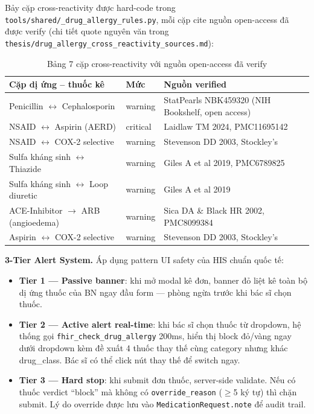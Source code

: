 \documentclass[a4paper,13pt,3p,oneside]{report}
\theoremstyle{definition}
\theoremstyle{remark}
\theoremstyle{definition}
\begin{document}
Bảy cặp cross-reactivity được hard-code trong \texttt{tools/shared/\_drug\_allergy\_rules.py}, mỗi cặp cite nguồn open-access đã được verify (chi tiết quote nguyên văn trong \texttt{thesis/drug\_allergy\_cross\_reactivity\_sources.md}):

\begin{table}[H]
\centering
\begin{tabular}{|p{4.5cm}|p{2cm}|p{6.5cm}|}
\hline
\textbf{Cặp dị ứng -- thuốc kê} & \textbf{Mức} & \textbf{Nguồn verified} \\
\hline
Penicillin $\leftrightarrow$ Cephalosporin & warning & StatPearls NBK459320 (NIH Bookshelf, open access) \\
\hline
NSAID $\leftrightarrow$ Aspirin (AERD) & critical & Laidlaw TM 2024, PMC11695142 \\
\hline
NSAID $\leftrightarrow$ COX-2 selective & warning & Stevenson DD 2003, Stockley's~\cite{stockley} \\
\hline
Sulfa kháng sinh $\leftrightarrow$ Thiazide & warning & Giles A et al 2019, PMC6789825 \\
\hline
Sulfa kháng sinh $\leftrightarrow$ Loop diuretic & warning & Giles A et al 2019 \\
\hline
ACE-Inhibitor $\to$ ARB (angioedema) & warning & Sica DA \& Black HR 2002, PMC8099384 \\
\hline
Aspirin $\leftrightarrow$ COX-2 selective & warning & Stevenson DD 2003, Stockley's~\cite{stockley} \\
\hline
\end{tabular}
\caption{Bảng 7 cặp cross-reactivity với nguồn open-access đã verify}
\label{tab:cross-reactivity}
\end{table}

\textbf{3-Tier Alert System.} Áp dụng pattern UI safety của HIS chuẩn quốc tế:
\begin{itemize}
  \item \textbf{Tier 1 --- Passive banner}: khi mở modal kê đơn, banner đỏ liệt kê toàn bộ dị ứng thuốc của BN ngay đầu form --- phòng ngừa trước khi bác sĩ chọn thuốc.
  \item \textbf{Tier 2 --- Active alert real-time}: khi bác sĩ chọn thuốc từ dropdown, hệ thống gọi \texttt{fhir\_check\_drug\_allergy} 200ms, hiển thị block đỏ/vàng ngay dưới dropdown kèm đề xuất 4 thuốc thay thế cùng category nhưng khác drug\_class. Bác sĩ có thể click nút thay thế để switch ngay.
  \item \textbf{Tier 3 --- Hard stop}: khi submit đơn thuốc, server-side validate. Nếu có thuốc verdict ``block'' mà không có \texttt{override\_reason} ($\geq$5 ký tự) thì chặn submit. Lý do override được lưu vào \texttt{MedicationRequest.note} để audit trail.
\end{itemize}
\end{document}
